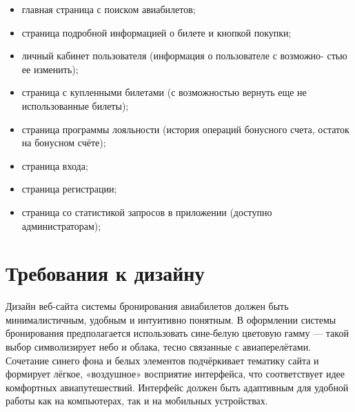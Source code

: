 \begin{itemize}
    \item главная страница с поиском авиабилетов;
    \item страница подробной информацией о билете и кнопкой покупки;
    \item личный кабинет пользователя (информация о пользователе с возможно- стью ее изменить);
    \item страница с купленными билетами (с возможностью вернуть еще не использованные билеты);
    \item страница программы лояльности (история операций бонусного счета, остаток на бонусном счёте);
    \item страница входа;
    \item страница регистрации;
    \item страница со статистикой запросов в приложении (доступно администраторам);
\end{itemize}

\section*{Требования к дизайну}

Дизайн веб-сайта системы бронирования авиабилетов должен быть минималистичным, удобным и интуитивно понятным.
В оформлении системы бронирования предполагается использовать сине-белую цветовую гамму — такой выбор символизирует небо и облака, тесно связанные с авиаперелётами. 
Сочетание синего фона и белых элементов подчёркивает тематику сайта и формирует лёгкое, «воздушное» восприятие интерфейса, что соответствует идее комфортных авиапутешествий. 
Интерфейс должен быть адаптивным для удобной работы как на компьютерах, так и на мобильных устройствах.


